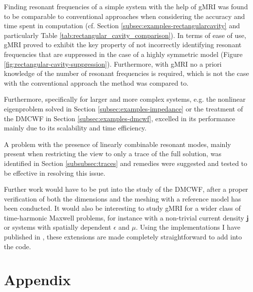 \documentclass[11pt, a4paper]{article}
\begin{document}
Finding resonant frequencies of a simple system with the help of \acrshort{gMRI} was found to 
be comparable to conventional approaches when considering the accuracy and
time spent in computation (cf. Section \ref{subsec:examples-rectangularcavity}
and particularly Table \ref{tab:rectangular_cavity_comparison}). In terms of
ease of use, \acrshort{gMRI} proved to exhibit the key property of not incorrectly
identifying resonant frequencies that are suppressed in the case of a highly
symmetric model (Figure \ref{fig:rectangular-cavity-suppression}). Furthermore,
with \acrshort{gMRI} no a priori knowledge of the number of resonant frequencies
is required, which is not the case with the conventional approach the method was
compared to.

Furthermore, specifically for larger and more complex systems, e.g.
the nonlinear eigenproblem solved in Section \ref{subsec:examples-impedance}
or the treatment of the \acrfull{DMCWF} in Section \ref{subsec:examples-dmcwf},
excelled in its performance mainly due to its scalability and time efficiency.

A problem with the presence of linearly combinable resonant modes, mainly present
when restricting the view to only a trace of the full solution, was identified
in Section \ref{subsubsec:traces} and remedies were suggested and tested to be
effective in resolving this issue.

Further work would have to be put into the study of the \acrshort{DMCWF}, after
a proper verification of both the dimensions and the meshing with a reference
model has been conducted. It would also be interesting to study \acrshort{gMRI}
for a wider class of time-harmonic Maxwell problems, for instance with a non-trivial
current density $\mathbf{j}$ or systems with spatially dependent $\epsilon$ and
$\mu$. Using the implementations I have published in \cite{git}, these extensions
are made completely straightforward to add into the code.

\newpage


\newpage
\section*{Appendix}
\label{sec:appendix}
\end{document}

